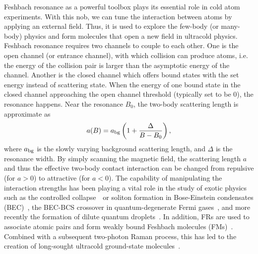 Feshbach resonance as a powerful toolbox plays its essential role in cold atom experiments. With this nob, we can tune the interaction between atoms by applying an external field. Thus, it is used to explore the few-body (or many-body) physics and form molecules that open a new field in ultracold physics. Feshbach resonance requires two channels to couple to each other. One is the open channel (or entrance channel), with which collision can produce atoms, i.e. the energy of the collision pair is larger than the asymptotic energy of the channel. Another is the closed channel which offers bound states with the set energy instead of scattering state\cite{RevModPhys.82.1225}. When the energy of one bound state in the closed channel approaching the open channel threshold (typically set to be 0), the resonance happens. Near the resonance $B_0$, the two-body scattering length is approximate as
\begin{equation}
a(B) = a_{\rm bg}\left(1+\frac{\Delta}{B-B_0}\right),
\label{FR}
\end{equation}
where $a_{\rm bg}$ is the slowly varying background scattering length, and $\Delta$ is the resonance width. By simply scanning the magnetic field, the scattering length $a$ and thus the effective two-body contact interaction can be changed from repulsive (for $a > 0$) to attractive (for $a < 0$). The capability of manipulating the interaction strengths has been playing a vital role in the study of exotic physics such as the controlled collapse~\cite{donley2001}~or soliton formation in Bose-Einstein condensates (BEC)~\cite{Khaykovich2002,Strecker2002}, the BEC-BCS crossover in quantum-degenerate Fermi gases~\citep{PhysRevLett.92.040403,PhysRevLett.92.120403,Bartenstein2004,Bourdel2004}, and more recently the formation of dilute quantum droplets~\cite{petrov2015,ferrier2016Observation,cabrera2018quantum}. In addition, FRs are used to associate atomic pairs and form weakly bound Feshbach molecules (FMs)~\cite{Kohler2006}. Combined with a subsequent two-photon Raman process, this has led to the creation of long-sought ultracold ground-state molecules~\cite{ni2008,Takekoshi2014,Molony2014,Park2015,PhysRevLett.116.205303,VOGES2020}.


